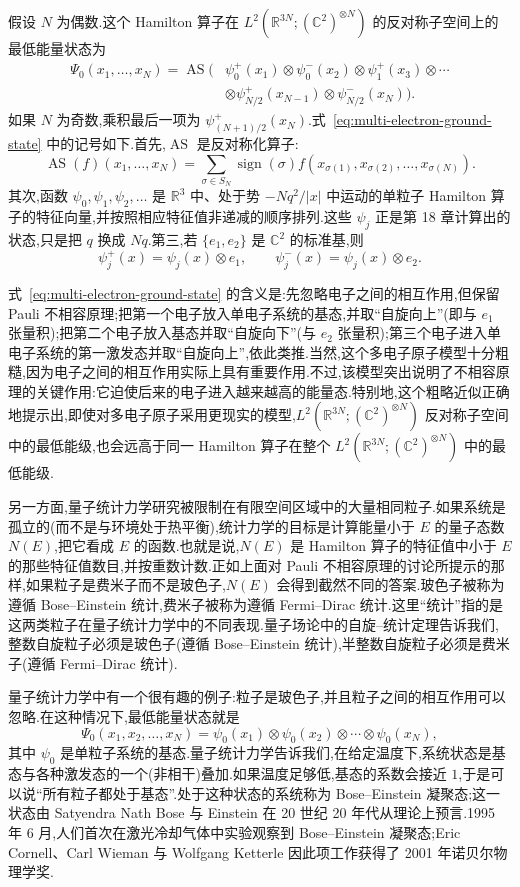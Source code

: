 假设 $N$ 为偶数.这个 Hamilton 算子在 $L^2(\mathbb R^{3N};(\mathbb C^2)^{\otimes N})$ 的反对称子空间上的最低能量状态为
\[
\begin{aligned}
 \Psi_0(x_1,\ldots,x_N)
 =\operatorname{AS}\bigl(&\psi_0^+(x_1)\otimes\psi_0^-(x_2)
 \otimes\psi_1^+(x_3)\otimes\cdots\\
 &\otimes\psi_{N/2}^+(x_{N-1})
 \otimes\psi_{N/2}^-(x_N)\bigr).\label{eq:multi-electron-ground-state}
\end{aligned}
\]
如果 $N$ 为奇数,乘积最后一项为 $\psi_{(N+1)/2}^+(x_N)$.式~\eqref{eq:multi-electron-ground-state} 中的记号如下.首先,$\operatorname{AS}$ 是反对称化算子:
\[
 \operatorname{AS}(f)(x_1,\ldots,x_N)
 =\sum_{\sigma\in S_N}\operatorname{sign}(\sigma)
 f(x_{\sigma(1)},x_{\sigma(2)},\ldots,x_{\sigma(N)}).
\]
其次,函数 $\psi_0,\psi_1,\psi_2,\ldots$ 是 $\mathbb R^3$ 中、处于势 $-Nq^2/|x|$ 中运动的单粒子 Hamilton 算子的特征向量,并按照相应特征值非递减的顺序排列.这些 $\psi_j$ 正是第 18 章计算出的状态,只是把 $q$ 换成 $Nq$.第三,若 $\{e_1,e_2\}$ 是 $\mathbb C^2$ 的标准基,则
\[
 \psi_j^+(x)=\psi_j(x)\otimes e_1,\qquad
 \psi_j^-(x)=\psi_j(x)\otimes e_2.
\]

式~\eqref{eq:multi-electron-ground-state} 的含义是:先忽略电子之间的相互作用,但保留 Pauli 不相容原理;把第一个电子放入单电子系统的基态,并取“自旋向上”(即与 $e_1$ 张量积);把第二个电子放入基态并取“自旋向下”(与 $e_2$ 张量积);第三个电子进入单电子系统的第一激发态并取“自旋向上”,依此类推.当然,这个多电子原子模型十分粗糙,因为电子之间的相互作用实际上具有重要作用.不过,该模型突出说明了不相容原理的关键作用:它迫使后来的电子进入越来越高的能量态.特别地,这个粗略近似正确地提示出,即使对多电子原子采用更现实的模型,$L^2(\mathbb R^{3N};(\mathbb C^2)^{\otimes N})$ 反对称子空间中的最低能级,也会远高于同一 Hamilton 算子在整个 $L^2(\mathbb R^{3N};(\mathbb C^2)^{\otimes N})$ 中的最低能级.

另一方面,量子统计力学研究被限制在有限空间区域中的大量相同粒子.如果系统是孤立的(而不是与环境处于热平衡),统计力学的目标是计算能量小于 $E$ 的量子态数 $N(E)$,把它看成 $E$ 的函数.也就是说,$N(E)$ 是 Hamilton 算子的特征值中小于 $E$ 的那些特征值数目,并按重数计数.正如上面对 Pauli 不相容原理的讨论所提示的那样,如果粒子是费米子而不是玻色子,$N(E)$ 会得到截然不同的答案.玻色子被称为遵循 Bose--Einstein 统计,费米子被称为遵循 Fermi--Dirac 统计.这里“统计”指的是这两类粒子在量子统计力学中的不同表现.量子场论中的自旋--统计定理告诉我们,整数自旋粒子必须是玻色子(遵循 Bose--Einstein 统计),半整数自旋粒子必须是费米子(遵循 Fermi--Dirac 统计).

量子统计力学中有一个很有趣的例子:粒子是玻色子,并且粒子之间的相互作用可以忽略.在这种情况下,最低能量状态就是
\[
 \Psi_0(x_1,x_2,\ldots,x_N)
 =\psi_0(x_1)\otimes\psi_0(x_2)\otimes\cdots\otimes\psi_0(x_N),
\]
其中 $\psi_0$ 是单粒子系统的基态.量子统计力学告诉我们,在给定温度下,系统状态是基态与各种激发态的一个(非相干)叠加.如果温度足够低,基态的系数会接近 $1$,于是可以说“所有粒子都处于基态”.处于这种状态的系统称为 Bose--Einstein 凝聚态;这一状态由 Satyendra Nath Bose 与 Einstein 在 20 世纪 20 年代从理论上预言.1995 年 6 月,人们首次在激光冷却气体中实验观察到 Bose--Einstein 凝聚态;Eric Cornell、Carl Wieman 与 Wolfgang Ketterle 因此项工作获得了 2001 年诺贝尔物理学奖.

